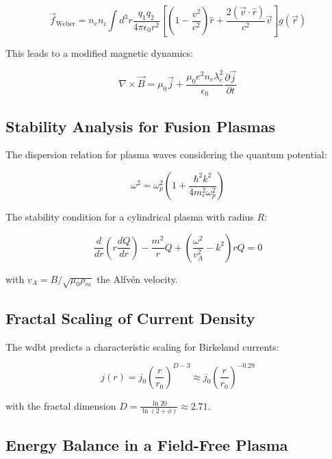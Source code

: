 \begin{equation}
\vec{f}_{\text{Weber}} = n_e n_i \int d^3r \frac{q_1 q_2}{4\pi\epsilon_0 r^2} \left[ \left(1-\frac{v^2}{c^2}\right)\hat{r} + \frac{2(\vec{v}\cdot\hat{r})}{c^2}\vec{v} \right] g(\vec{r})
\end{equation}

This leads to a modified magnetic dynamics:

\begin{equation}
\label{eq:modified_ampere}
\nabla \times \vec{B} = \mu_0 \vec{j} + \frac{\mu_0 e^2 n_e \lambda_c^2}{\epsilon_0} \frac{\partial \vec{j}}{\partial t}
\end{equation}

\subsection{Stability Analysis for Fusion Plasmas}

The dispersion relation for plasma waves considering the quantum potential:

\begin{equation}
\label{eq:dispersion}
\omega^2 = \omega_p^2 \left(1 + \frac{\hbar^2 k^2}{4m_e^2 \omega_p^2}\right)
\end{equation}

The stability condition for a cylindrical plasma with radius $R$:

\begin{equation}
\label{eq:stability}
\frac{d}{dr}\left(r\frac{dQ}{dr}\right) - \frac{m^2}{r}Q + \left(\frac{\omega^2}{v_A^2} - k^2\right)rQ = 0
\end{equation}

with $v_A = B/\sqrt{\mu_0 \rho_m}$ the Alfvén velocity.

\subsection{Fractal Scaling of Current Density}

The \gls{wdbt} predicts a characteristic scaling for Birkeland currents:

\begin{equation}
j(r) = j_0 \left(\frac{r}{r_0}\right)^{D-3} \approx j_0 \left(\frac{r}{r_0}\right)^{-0.29}
\end{equation}

with the fractal dimension $D = \frac{\ln 20}{\ln(2+\phi)} \approx 2.71$.

\subsection{Energy Balance in a Field-Free Plasma}

